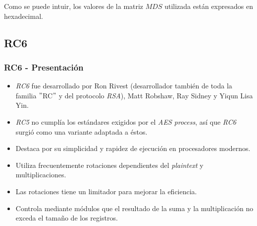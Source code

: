 \documentclass{beamer}
\begin{document}
\begin{frame}
	Como se puede intuir, los valores de la matriz $MDS$ utilizada están expresados en hexadecimal.
	\end{frame}

	\subsection{RC6}
	\begin{frame}
	\frametitle{RC6 - Presentación}
	\begin{itemize}
		\item \textit{RC6} fue desarrollado por Ron Rivest (desarrollador también de toda la familia $"$RC$"$ y del protocolo \textit{RSA}), Matt Robshaw, Ray Sidney y Yiqun Lisa Yin.
	
		\item \textit{RC5} no cumplía los estándares exigidos por el \textit{AES process}, así que \textit{RC6} surgió como una variante adaptada a éstos.
		
		\item Destaca por su simplicidad y rapidez de ejecución en procesadores modernos.
			
		\item Utiliza frecuentemente rotaciones dependientes del \textit{plaintext} y multiplicaciones.
		
		\item Las rotaciones tiene un limitador para mejorar la eficiencia.
		
		\item Controla mediante módulos que el resultado de la suma y la multiplicación no exceda el tamaño de los registros.
	\end{itemize}
	\end{frame}
	
\end{document}
